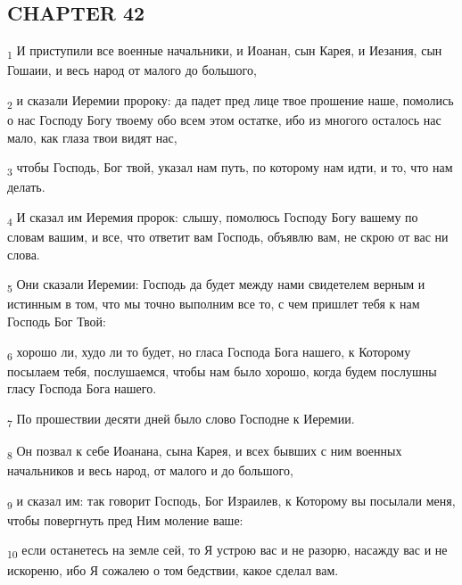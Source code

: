 \subsection{CHAPTER 42}
\begin{tcolorbox}
\textsubscript{1} И приступили все военные начальники, и Иоанан, сын Карея, и Иезания, сын Гошаии, и весь народ от малого до большого,
\end{tcolorbox}
\begin{tcolorbox}
\textsubscript{2} и сказали Иеремии пророку: да падет пред лице твое прошение наше, помолись о нас Господу Богу твоему обо всем этом остатке, ибо из многого осталось нас мало, как глаза твои видят нас,
\end{tcolorbox}
\begin{tcolorbox}
\textsubscript{3} чтобы Господь, Бог твой, указал нам путь, по которому нам идти, и то, что нам делать.
\end{tcolorbox}
\begin{tcolorbox}
\textsubscript{4} И сказал им Иеремия пророк: слышу, помолюсь Господу Богу вашему по словам вашим, и все, что ответит вам Господь, объявлю вам, не скрою от вас ни слова.
\end{tcolorbox}
\begin{tcolorbox}
\textsubscript{5} Они сказали Иеремии: Господь да будет между нами свидетелем верным и истинным в том, что мы точно выполним все то, с чем пришлет тебя к нам Господь Бог Твой:
\end{tcolorbox}
\begin{tcolorbox}
\textsubscript{6} хорошо ли, худо ли то будет, но гласа Господа Бога нашего, к Которому посылаем тебя, послушаемся, чтобы нам было хорошо, когда будем послушны гласу Господа Бога нашего.
\end{tcolorbox}
\begin{tcolorbox}
\textsubscript{7} По прошествии десяти дней было слово Господне к Иеремии.
\end{tcolorbox}
\begin{tcolorbox}
\textsubscript{8} Он позвал к себе Иоанана, сына Карея, и всех бывших с ним военных начальников и весь народ, от малого и до большого,
\end{tcolorbox}
\begin{tcolorbox}
\textsubscript{9} и сказал им: так говорит Господь, Бог Израилев, к Которому вы посылали меня, чтобы повергнуть пред Ним моление ваше:
\end{tcolorbox}
\begin{tcolorbox}
\textsubscript{10} если останетесь на земле сей, то Я устрою вас и не разорю, насажду вас и не искореню, ибо Я сожалею о том бедствии, какое сделал вам.
\end{tcolorbox}
